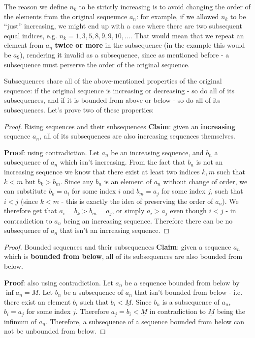The reason we define $n_{k}$ to be strictly increasing is to avoid changing the order of the elements from the original sequeunce $a_{n}$: for example, if we allowed $n_{k}$ to be ``just'' increasing, we might end up with a case where there are two subsequent equal indices, e.g. $n_{k}=1,3,5,8,9,9,10,\dots$. That would mean that we repeat an element from $a_{n}$ \textbf{twice or more} in the subsequence (in the example this would be $a_{9}$), rendering it invalid as a subsequence, since as mentioned before - a subsequence must perserve the order of the original sequence.

Subsequences share all of the above-mentioned properties of the original sequence: if the original sequence is increasing or decreasing - so do all of its subsequences, and if it is bounded from above or below - so do all of its subsequences. Let's prove two of these properties:

\begin{proof}{Rising sequences and their subsequences}{}
	\textbf{Claim}: given an \textbf{increasing} sequence $a_{n}$, all of its subsequences are also increasing sequences themselves.

	\vspace{1em}
	\textbf{Proof}: using contradiction. Let $a_{n}$ be an increasing sequence, and $b_{n}$ a subsequence of $a_{n}$ which isn't increasing. From the fact that $b_{n}$ is not an increasing sequence we know that there exist at least two indices $k,m$ such that $k<m$ but $b_{k}>b_{m}$. Since any $b_{n}$ is an element of $a_{n}$ without change of order, we can substitute $b_{k}=a_{i}$ for some index $i$ and $b_{m}=a_{j}$ for some index $j$, such that $i<j$ (since $k<m$ - this is exactly the idea of preserving the order of $a_{n}$). We therefore get that $a_{i}=b_{k}>b_{m}=a_{j}$, or simply $a_{i}>a_{j}$ even though $i<j$ - in contradiction to $a_{n}$ being an increasing sequence. Therefore there can be no subsequence of $a_{n}$ that isn't an increasing sequence.
\end{proof}

\begin{proof}{Bounded sequences and their subsequences}{}
	\textbf{Claim}: given a sequence $a_{n}$ which is \textbf{bounded from below}, all of its subsequences are also bounded from below.

	\vspace{1em}
	\textbf{Proof}: also using contradiction. Let $a_{n}$ be a sequence bounded from below by $\inf a_{n}=\underline{M}$. Let $b_{n}$ be a subsequence of $a_{n}$ that isn't bounded from below - i.e. there exist an element $b_{i}$ such that $b_{i}<\underline{M}$. Since $b_{n}$ is a subsequence of $a_{n}$, $b_{i}=a_{j}$ for some index $j$. Therefore $a_{j}=b_{i}<\underline{M}$ in contradiction to $\underline{M}$ being the infimum of $a_{n}$. Therefore, a subsequence of a sequence bounded from below can not be unbounded from below.
\end{proof}

